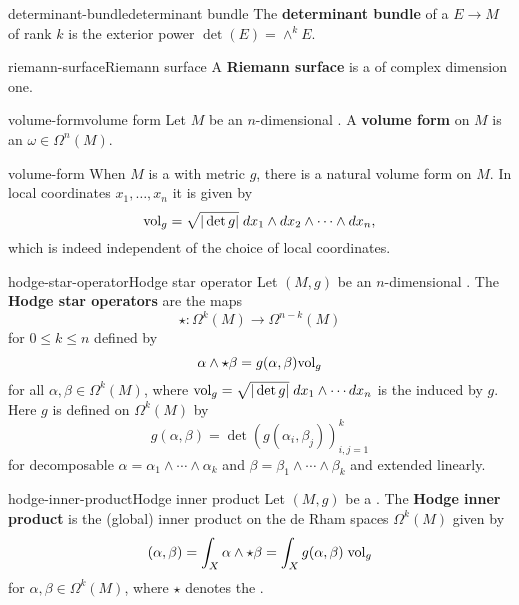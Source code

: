 \begin{topic}{determinant-bundle}{determinant bundle}
    The \textbf{determinant bundle} of a  $E \to M$ of rank $k$ is the exterior power $\det(E) = \wedge^k E$.
\end{topic}

\begin{topic}{riemann-surface}{Riemann surface}
    A \textbf{Riemann surface} is a   of complex dimension one.
\end{topic}

\begin{topic}{volume-form}{volume form}
    Let $M$ be an $n$-dimensional . A \textbf{volume form} on $M$ is an  $\omega \in \Omega^n(M)$.
\end{topic}

\begin{example}{volume-form}
    When $M$ is a  with metric $g$, there is a natural volume form on $M$. In local coordinates $x_1, \ldots, x_n$ it is given by
    \[ \textup{vol}_g = \sqrt{|\det g|} \; dx_1 \wedge dx_2 \wedge \cdots \wedge dx_n , \]
    which is indeed independent of the choice of local coordinates.
\end{example}

\begin{topic}{hodge-star-operator}{Hodge star operator}
    Let $(M, g)$ be an $n$-dimensional . The \textbf{Hodge star operators} are the maps
    \[ \star : \Omega^k(M) \to \Omega^{n - k}(M) \]
    for $0 \le k \le n$ defined by
    \[ \alpha \wedge \star \beta = g(\alpha, \beta) \textup{vol}_g \]
    for all $\alpha, \beta \in \Omega^k(M)$, where $\textup{vol}_g = \sqrt{|\det g|} \; dx_1 \wedge \cdots dx_n$ is the  induced by $g$. Here $g$ is defined on $\Omega^k(M)$ by
    \[ g(\alpha, \beta) = \det\left(g(\alpha_i, \beta_j)\right)_{i, j = 1}^{k} \]
    for decomposable $\alpha = \alpha_1 \wedge \cdots \wedge \alpha_k$ and $\beta = \beta_1 \wedge \cdots \wedge \beta_k$ and extended linearly.
\end{topic}

\begin{topic}{hodge-inner-product}{Hodge inner product}
    Let $(M, g)$ be a . The \textbf{Hodge inner product} is the (global) inner product on the de Rham spaces $\Omega^k(M)$ given by
    \[ (\alpha, \beta) = \int_X \alpha \wedge \star \beta = \int_X g(\alpha, \beta) \; \textup{vol}_g \]
    for $\alpha, \beta \in \Omega^k(M)$, where $\star$ denotes the .
\end{topic}

